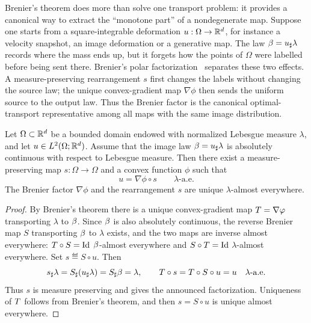 Brenier's theorem does more than solve one transport problem: it provides a canonical way to extract the ``monotone part'' of a nondegenerate map. Suppose one starts from a square-integrable deformation $u:\Omega\to\mathbb{R}^d$, for instance a velocity snapshot, an image deformation or a generative map. The law $\beta=u_\sharp\lambda$ records where the mass ends up, but it forgets how the points of $\Omega$ were labelled before being sent there. Brenier's polar factorization~\cite{MR923203,Brenier91} separates these two effects. A measure-preserving rearrangement $s$ first changes the labels without changing the source law; the unique convex-gradient map $\nabla\phi$ then sends the uniform source to the output law. Thus the Brenier factor is the canonical optimal-transport representative among all maps with the same image distribution.

\begin{prop}\label{prop-polar-factorization}
	Let $\Omega\subset\mathbb{R}^d$ be a bounded domain endowed with normalized Lebesgue measure $\lambda$, and let $u\in L^2(\Omega;\mathbb{R}^d)$. Assume that the image law $\beta=u_\sharp\lambda$ is absolutely continuous with respect to Lebesgue measure. Then there exist a measure-preserving map $s:\Omega\to\Omega$ and a convex function $\phi$ such that
	\[
		u=\nabla\phi\circ s
		\qquad \lambda\text{-a.e.}
	\]
	The Brenier factor $\nabla\phi$ and the rearrangement $s$ are unique $\lambda$-almost everywhere.
\end{prop}
\begin{proof}
	By Brenier's theorem there is a unique convex-gradient map $T=\nabla\varphi$ transporting $\lambda$ to $\beta$. Since $\beta$ is also absolutely continuous, the reverse Brenier map $S$ transporting $\beta$ to $\lambda$ exists, and the two maps are inverse almost everywhere: $T\circ S=\mathrm{Id}$ $\beta$-almost everywhere and $S\circ T=\mathrm{Id}$ $\lambda$-almost everywhere. Set $s\eqdef S\circ u$. Then
	\[
		s_\sharp\lambda=S_\sharp(u_\sharp\lambda)=S_\sharp\beta=\lambda,
		\qquad
		T\circ s=T\circ S\circ u=u
		\quad\lambda\text{-a.e.}
	\]
	Thus $s$ is measure preserving and gives the announced factorization. Uniqueness of $T$ follows from Brenier's theorem, and then $s=S\circ u$ is unique almost everywhere.
\end{proof}

